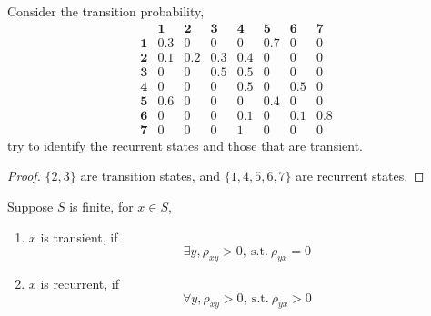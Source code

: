\begin{example}
	Consider the transition probability,
	\begin{equation*}
		\begin{array}{cccccccc}
			           & \mathbf{1} & \mathbf{2} & \mathbf{3} & \mathbf{4} & \mathbf{5} & \mathbf{6} & \mathbf{7} \\
			\mathbf{1} & 0.3        & 0          & 0          & 0          & 0.7        & 0          & 0          \\
			\mathbf{2} & 0.1        & 0.2        & 0.3        & 0.4        & 0          & 0          & 0          \\
			\mathbf{3} & 0          & 0          & 0.5        & 0.5        & 0          & 0          & 0          \\
			\mathbf{4} & 0          & 0          & 0          & 0.5        & 0          & 0.5        & 0          \\
			\mathbf{5} & 0.6        & 0          & 0          & 0          & 0.4        & 0          & 0          \\
			\mathbf{6} & 0          & 0          & 0          & 0.1        & 0          & 0.1        & 0.8        \\
			\mathbf{7} & 0          & 0          & 0          & 1          & 0          & 0          & 0
		\end{array}
	\end{equation*}
	try to identify the recurrent states and those that are transient.
\end{example}

\begin{proof}
	\(\{2,3\}\) are transition states, and \(\{1,4,5,6,7\}\) are recurrent states.
\end{proof}

\begin{remark}
	Suppose \(S\) is finite, for \(x\in S\),
	\begin{enumerate}
		\item \(x\) is transient, if
		      \begin{equation*}
			      \exists y,\rho_{xy}>0,\ \text{s.t.}\ \rho_{yx}=0
		      \end{equation*}
		\item \(x\) is recurrent, if
		      \begin{equation*}
			      \forall y,\rho_{xy}>0,\ \text{s.t.}\ \rho_{yx}>0
		      \end{equation*}
	\end{enumerate}
\end{remark}

